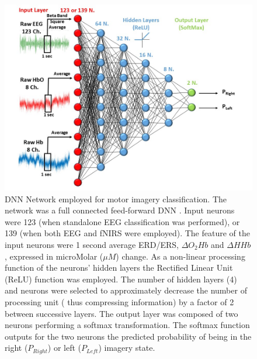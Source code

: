 \documentclass[12pt ]{iopart}
\begin{document}
\begin{figure}
	\includegraphics[width=\linewidth]{Slide3.JPG}
	\caption{DNN Network employed for motor imagery classification. The network was a full connected feed-forward  DNN . Input neurons were 123 (when standalone EEG classification was performed), or 139 (when both EEG and fNIRS were employed). 
	The feature of the input neurons were 1 second average ERD/ERS, $\Delta O_{2}Hb$ and $\Delta HHb$, expressed in microMolar ($\mu M$) change. 
	 As a non-linear processing function of the neurons' hidden layers the Rectified Linear Unit (ReLU) function was employed. 
	 The number of hidden layers (4) and neurons were selected to approximately decrease the number of processing unit ( thus compressing information) by a factor of 2 between successive layers. The output layer was composed of two neurons performing a softmax transformation. The softmax function outputs for the two neurons  the predicted probability of being in the right ($P_{Right}$) or left ($P_{Left}$) imagery state. }
	\label{fig:fig3}
\end{figure}
\end{document}
